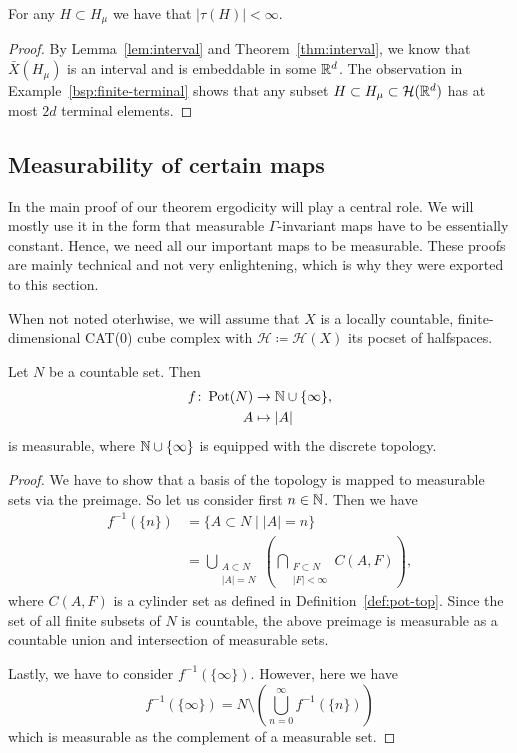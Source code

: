 \begin{lemma}
  \label{lem:finite-terminal}
  For any \(H \subset H_\mu\) we have that \(|\tau(H)| < \infty\).
\end{lemma}

\begin{proof}
  By Lemma~\ref{lem:interval} and Theorem~\ref{thm:interval}, we know that \(\bar X(H_\mu)\) is an interval and is embeddable in some \(\mathbb{R}^d\). The observation in Example~\ref{bsp:finite-terminal} shows that any subset \(H \subset H_\mu \subset \mathcal{H}(\mathbb{R}^d)\) has at most \(2d\) terminal elements.
\end{proof}

\subsection{Measurability of certain maps}
\label{sec:meas-maps}

In the main proof of our theorem ergodicity will play a central role. We will mostly use it in the form that measurable \(\Gamma\)-invariant maps have to be essentially constant. Hence, we need all our important maps to be measurable. These proofs are mainly technical and not very enlightening, which is why they were exported to this section.

When not noted oterhwise, we will assume that \(X\) is a locally countable, finite-dimensional CAT(0) cube complex with \(\mathcal{H} \coloneqq \mathcal{H}(X)\) its pocset of halfspaces.

\begin{lemma}
  \label{lem:measurable-countable}
  Let \(N\) be a countable set. Then
  \begin{align*}
    f\colon \operatorname{Pot}(N) &\to \mathbb{N} \cup \{\infty\},\\
    A &\mapsto |A|
  \end{align*}
  is measurable, where \(\mathbb{N} \cup \{\infty\}\) is equipped with the discrete topology.
\end{lemma}

\begin{proof}
  We have to show that a basis of the topology is mapped to measurable sets via the preimage. So let us consider first \(n \in \mathbb{N}\). Then we have
  \begin{align*}
    f^{-1}(\{n\})
    & = \{ A \subset N \mid |A| = n\}\\
    & = \bigcup_{\substack{A \subset N\\|A| = N}} \left ( \bigcap_{\substack{F \subset N\\|F|< \infty}}C(A,F)\right),
  \end{align*}
  where \(C(A,F)\) is a cylinder set as defined in Definition~\ref{def:pot-top}. Since the set of all finite subsets of \(N\) is countable, the above preimage is measurable as a countable union and intersection of measurable sets.

  Lastly, we have to consider \(f^{-1}(\{\infty\})\). However, here we have
  \[
    f^{-1}(\{\infty\}) = N \setminus \left (\bigcup_{n=0}^\infty f^{-1}(\{n\})\right)
  \]
  which is measurable as the complement of a measurable set.
\end{proof}

